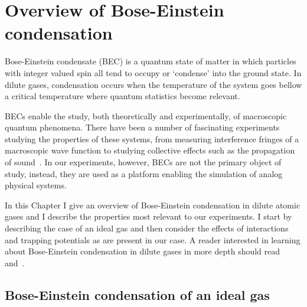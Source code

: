 
\renewcommand{\thechapter}{2}

\chapter{Overview of Bose-Einstein condensation}
\label{ch:BECs}

Bose-Einstein condensate (BEC) is a quantum state of matter in which particles with integer valued spin all tend to occupy or `condense' into the ground state. In dilute gases, condensation occurs when the temperature of the system goes bellow a critical temperature where quantum statistics become relevant. 

BECs enable the study, both theoretically and experimentally, of macroscopic quantum phenomena. There have been a number of fascinating experiments studying the properties of these systems, from measuring interference fringes of a macroscopic wave function to studying collective effects such as the propagation of sound~\cite{ketterle_w._making_1999}. In our experiments, however, BECs are not the primary object of study, instead, they are used as a platform enabling the simulation of analog physical systems. 

In this Chapter I give an overview of Bose-Einstein condensation in dilute atomic gases and I describe the properties most relevant to our experiments. I start by describing the case of an ideal gas and then consider the effects of interactions and trapping potentials as are present in our case. A reader interested in learning about Bose-Einstein condensation in dilute gases in more depth should read~\cite{Pethick} and~\cite{noauthor_bose-einstein_2003}.

\section{Bose-Einstein condensation of an ideal gas}


